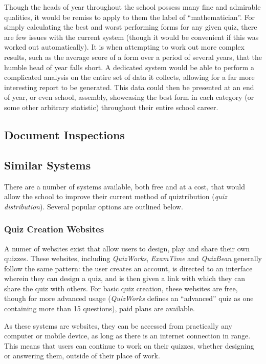 Though the heads of year throughout the school possess many fine and admirable qualities, it would be remiss to apply to them the label of ``mathematician''.  For simply calculating the best and worst performing forms for any given quiz, there are few issues with the current system (though it would be convenient if this was worked out automatically). It is when attempting to work out more complex results, such as the average score of a form over a period of several years, that the humble head of year falls short. A dedicated system would be able to perform a complicated analysis on the entire set of data it collects, allowing for a far more interesting report to be generated. This data could then be presented at an end of year, or even school, assembly, showcasing the best form in each category (or some other arbitrary statistic) throughout their entire school career.

\subsection{Document Inspections}

\subsection{Similar Systems}
There are a number of systems available, both free and at a cost, that would allow the school to improve their current method of quiztribution (\textit{quiz distribution}). Several popular options are outlined below.

\subsubsection{Quiz Creation Websites}
A numer of websites exist that allow users to design, play and share their own quizzes. These websites, including \textit{QuizWorks}, \textit{ExamTime} and \textit{QuizBean} generally follow the same pattern: the user creates an account, is directed to an interface wherein they can design a quiz, and is then given a link with which they can share the quiz with others. For basic quiz creation, these websites are free, though for more advanced usage (\textit{QuizWorks} defines an ``advanced'' quiz as one containing more than 15 questions), paid plans are available.

As these systems are websites, they can be accessed from practically any computer or mobile device, as long as there is an internet connection in range. This means that users can continue to work on their quizzes, whether designing or answering them, outside of their place of work.

